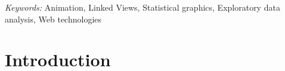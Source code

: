 \documentclass[12pt]{article}\usepackage[]{graphicx}\usepackage[]{color}
\begin{document}
\noindent%
{\it Keywords:}  Animation, Linked Views, Statistical graphics, Exploratory data analysis, Web technologies
\vfill

\newpage
{} %




\section{Introduction}
\label{sec:intro}






\end{document}
